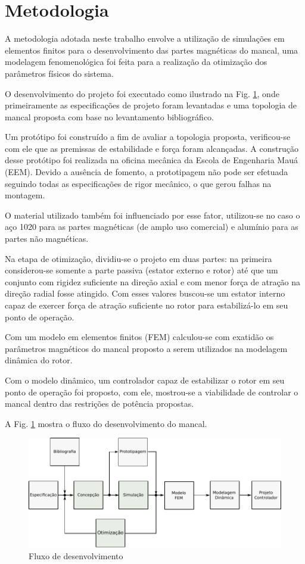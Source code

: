 \section{Metodologia}

A metodologia adotada neste trabalho envolve a utilização de simulações em elementos finitos para o desenvolvimento das partes magnéticas do mancal, uma modelagem fenomenológica foi feita para a realização da otimização dos parâmetros físicos do sistema. 

O desenvolvimento do projeto foi executado como ilustrado na Fig. \ref{fig:metodologia:fluxo:dev}, onde primeiramente as especificações de projeto foram levantadas e uma topologia de mancal proposta com base no levantamento bibliográfico. 

Um protótipo foi construído a fim de avaliar a topologia proposta, verificou-se com ele que as premissas de estabilidade e força foram alcançadas. A construção desse protótipo foi realizada na oficina mecânica da Escola de Engenharia Mauá (EEM). Devido a ausência de fomento, a prototipagem não pode ser efetuada seguindo todas as especificações de rigor mecânico, o que gerou falhas na montagem.

O material utilizado também foi influenciado por esse fator, utilizou-se no caso o aço 1020 para as partes magnéticas (de amplo uso comercial) e alumínio para as partes não magnéticas. 

Na etapa de otimização, dividiu-se o projeto em duas partes: na primeira considerou-se somente a parte passiva (estator externo e rotor) até que um conjunto com rigidez suficiente na direção axial e com menor força de atração na direção radial fosse atingido. Com esses valores buscou-se um estator interno capaz de exercer força de atração suficiente no rotor para estabilizá-lo em seu ponto de operação.

Com um modelo em elementos finitos (FEM) calculou-se com exatidão os parâmetros magnéticos do mancal proposto a serem utilizados na modelagem dinâmica do rotor.

Com o modelo dinâmico, um controlador capaz de estabilizar o rotor em seu ponto de operação foi proposto, com ele, mostrou-se a viabilidade de controlar o mancal dentro das restrições de potência propostas. 

A Fig. \ref{fig:metodologia:fluxo:dev} mostra o fluxo do desenvolvimento do mancal.

 
\begin{figure}[th!]
	\centering
	\includegraphics[width=1\linewidth]{Figs/metodologia_fluxo_dev}
	\caption{Fluxo de desenvolvimento}
	\label{fig:metodologia:fluxo:dev}
\end{figure} 
 
